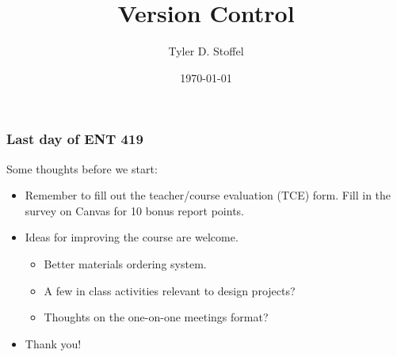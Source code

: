 \documentclass[
8pt,
]{beamer}
\title{Version Control}
\date{\today}
\author{Tyler D. Stoffel}
\institute{ENT 419: Senior Project I}
\begin{document}
\maketitle
%
\begin{frame}
  \frametitle{Last day of ENT 419}
  Some thoughts before we start:
  \begin{itemize}
    \item<2-> Remember to fill out the teacher/course evaluation (TCE) form. Fill in the survey on Canvas for 10 bonus report points.
    \item<3-> Ideas for improving the course are welcome.
          \begin{itemize}
            \item Better materials ordering system.
            \item A few in class activities relevant to design projects?
            \item Thoughts on the one-on-one meetings format?
          \end{itemize}
    \item<4-> Thank you!
  \end{itemize}
\end{frame}
%
\end{document}
